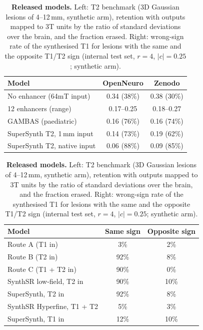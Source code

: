 \begin{table}[!htbp]
{\caption{\textbf{Released models.} Left: T2 benchmark (3D Gaussian lesions of 4--12\,mm, synthetic arm), retention with outputs mapped to 3T units by the ratio of standard deviations over the brain, and the fraction erased. Right: wrong-sign rate of the synthesised T1 for lesions with the same and the opposite T1/T2 sign (internal test set, $r=4$, $|c|=0.25$; synthetic arm).}}
{\scriptsize\setlength{\tabcolsep}{3pt}\begin{minipage}[t]{0.47\linewidth}
\begin{tabular*}{\linewidth}[t]{@{\extracolsep{\fill}}lcc@{}}
\toprule
Model & OpenNeuro & Zenodo \\
\midrule
No enhancer (64mT input) & 0.34 (38\%) & 0.38 (30\%) \\
12 enhancers (range) & 0.17--0.25 & 0.18--0.27 \\
GAMBAS (paediatric) & 0.16 (76\%) & 0.16 (74\%) \\
SuperSynth T2, 1\,mm input & 0.14 (73\%) & 0.19 (62\%) \\
SuperSynth T2, native input & 0.06 (88\%) & 0.09 (85\%) \\
\bottomrule
\end{tabular*}\end{minipage}\hfill
\begin{minipage}[t]{0.5\linewidth}
\begin{tabular*}{\linewidth}[t]{@{\extracolsep{\fill}}lcc@{}}
\toprule
Model & Same sign & Opposite sign \\
\midrule
Route A (T1 in) & 3\% & 2\% \\
Route B (T2 in) & 92\% & 8\% \\
Route C (T1 + T2 in) & 90\% & 0\% \\
SynthSR low-field, T2 in & 90\% & 10\% \\
SuperSynth, T2 in & 92\% & 8\% \\
SynthSR Hyperfine, T1 + T2 & 5\% & 3\% \\
SuperSynth, T1 in & 12\% & 10\% \\
\bottomrule
\end{tabular*}\end{minipage}}
\end{table}
